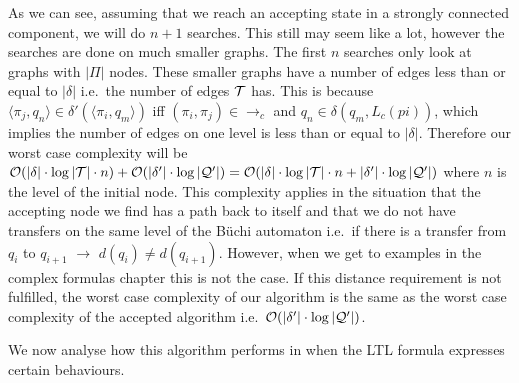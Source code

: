 As we can see, assuming that we reach an accepting state in a strongly connected component, we will do $n+1$ searches. This still may seem like a lot, however the searches are done on much smaller graphs. The first $n$ searches only look at graphs with $|\Pi|$ nodes. These smaller graphs have a number of edges less than or equal to $|\delta|$ i.e.\ the number of edges $\mathcal{T}$ has. This is because $\langle \pi_j, q_n \rangle \in \delta' (\langle \pi_i, q_m \rangle )$ iff $(\pi_i , \pi_j ) \in \rightarrow_c$ and $q_n \in \delta (q_m, L_c(pi))$, which implies the number of edges on one level is less than or equal to $|\delta|$. Therefore our worst case complexity will be $\mathcal{O}(|\delta|\cdot \log |\mathcal{T}| \cdot n) + \mathcal{O}(|\delta'| \cdot \log|\mathcal{Q}'|) = \mathcal{O}(|\delta|\cdot \log |\mathcal{T}| \cdot n + |\delta'| \cdot \log|\mathcal{Q}'|)$ where $n$ is the level of the initial node. This complexity applies in the situation that the accepting node we find has a path back to itself and that we do not have transfers on the same level of the B\"uchi automaton i.e.\ if there is a transfer from $q_i$ to $q_{i+1}$ $\rightarrow$ $d(q_i) \neq d(q_{i+1})$. However, when we get to examples in the complex formulas chapter this is not the case. If this distance requirement is not fulfilled, the worst case complexity of our algorithm is the same as the worst case complexity of the accepted algorithm i.e.\ $\mathcal{O}(|\delta'| \cdot \log|\mathcal{Q}'| )$.  


We now analyse how this algorithm performs in when the LTL formula expresses certain behaviours. 